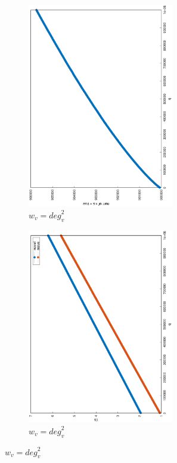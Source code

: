 \documentclass[12pt]{report}
\begin{document}
\begin{figure}
\begin{subfigure}{0.35\textwidth}
	\includegraphics[width=0.7\textwidth,angle=-90]{graph/ba_coverage_1000000_10_0.1_power_2.eps}
	\caption{$ w_v = \mathit{deg}_v^2 $}
\end{subfigure}
\begin{subfigure}{0.35\textwidth}
	\includegraphics[width=0.7\textwidth,angle=-90]{graph/ba_q_1000000_10_0.1_power_2.eps}
	\caption{$ w_v = \mathit{deg}_v^2 $}
\end{subfigure}


\end{figure}
\end{document}
